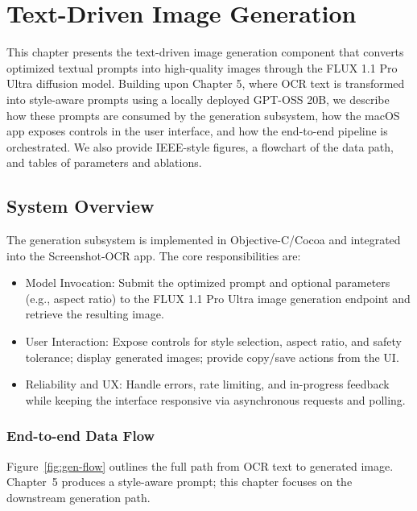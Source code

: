 \chapter{Text-Driven Image Generation}

This chapter presents the text-driven image generation component that converts optimized textual prompts into high-quality images through the FLUX 1.1 Pro Ultra diffusion model. Building upon Chapter 5, where OCR text is transformed into style-aware prompts using a locally deployed GPT-OSS 20B, we describe how these prompts are consumed by the generation subsystem, how the macOS app exposes controls in the user interface, and how the end-to-end pipeline is orchestrated. We also provide IEEE-style figures, a flowchart of the data path, and tables of parameters and ablations.

\section{System Overview}
The generation subsystem is implemented in Objective-C/Cocoa and integrated into the Screenshot-OCR app. The core responsibilities are:
\begin{itemize}
    \item Model Invocation: Submit the optimized prompt and optional parameters (e.g., aspect ratio) to the FLUX 1.1 Pro Ultra image generation endpoint and retrieve the resulting image.
    \item User Interaction: Expose controls for style selection, aspect ratio, and safety tolerance; display generated images; provide copy/save actions from the UI.
    \item Reliability and UX: Handle errors, rate limiting, and in-progress feedback while keeping the interface responsive via asynchronous requests and polling.
\end{itemize}

\subsection{End-to-end Data Flow}
Figure~\ref{fig:gen-flow} outlines the full path from OCR text to generated image. Chapter~5 produces a style-aware prompt; this chapter focuses on the downstream generation path.

